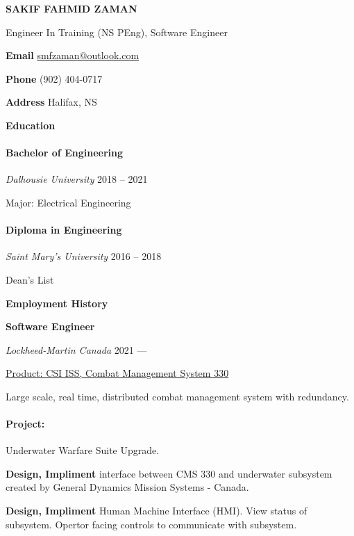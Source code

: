 \documentclass[12pt, twocolumn]{article}
\newcommand{\cvsection}[1] {
  \begin{center}
    \large\color{draculapurple}\textbf{#1}
  \end{center}
}
\begin{document}
\begin{center}
  \color{draculapurple}\textbf{\huge SAKIF FAHMID ZAMAN}

  Engineer In Training (NS PEng), Software Engineer
\end{center}



\begin{multicols}{3}
\textbf{Email} \hfill \href{mailto:smfzaman@outlook.com}{smfzaman@outlook.com}

\textbf{Phone} \hfill (902) 404-0717

\textbf{Address} \hfill Halifax, NS

\end{multicols}

\cvsection{Education}
\paragraph{Bachelor of Engineering} \emph{Dalhousie University} \hfill 2018 -- 2021

Major: Electrical Engineering

\paragraph{Diploma in Engineering} \emph{Saint Mary's University} \hfill 2016 -- 2018

Dean's List

\cvsection{Employment History}

\textbf{\color{draculapurple}Software Engineer}

\emph{Lockheed-Martin Canada} \hfill 2021 ---

\underline{Product: CSI ISS, Combat Management System 330}

Large scale, real time, distributed combat management system with redundancy.

\paragraph{Project:} Underwater Warfare Suite Upgrade.

\textbf{Design, Impliment} interface between CMS 330 and underwater subsystem created by General Dynamics Mission Systems - Canada.

\textbf{Design, Impliment} Human Machine Interface (HMI). View status of subsystem. Opertor facing controls to communicate with subsystem.
\end{document}
